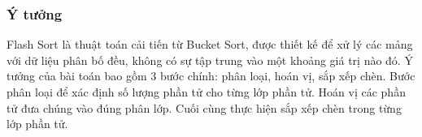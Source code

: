 \subsubsection{Ý tưởng}
Flash Sort là thuật toán cải tiến từ Bucket Sort, được thiết kế để xử lý các mảng với dữ liệu phân bố đều, không có sự tập trung vào một khoảng giá trị nào đó. Ý tưởng của bài toán bao gồm 3 bước chính: phân loại, hoán vị, sắp xếp chèn. Bước phân loại để xác định số lượng phần tử cho từng lớp phần tử. Hoán vị các phần tử đưa chúng vào đúng phân lớp. Cuối cùng thực hiện sắp xếp chèn trong từng lớp phần tử.